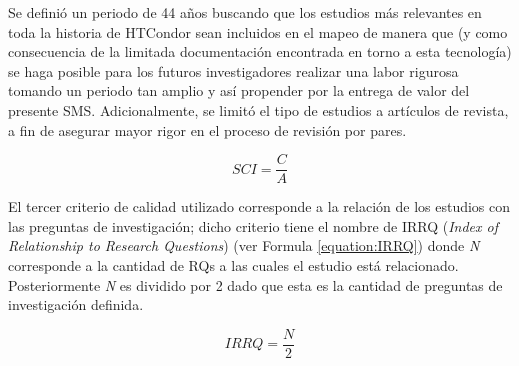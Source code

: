 Se definió un periodo de 44 años buscando que los estudios más relevantes en toda la historia de HTCondor sean incluidos en el mapeo de manera que (y como consecuencia de la limitada documentación encontrada en torno a esta tecnología) se haga posible para los futuros investigadores realizar una labor rigurosa tomando un periodo tan amplio y así propender por la entrega de valor del presente SMS. Adicionalmente, se limitó el tipo de estudios a artículos de revista, a fin de asegurar mayor rigor en el proceso de revisión por pares.

\begin{equation}
	\label{equation:SCI}
	SCI = \frac{C}{A}
\end{equation}

El tercer criterio de calidad utilizado corresponde a la relación de los estudios con las preguntas de investigación; dicho criterio tiene el nombre de IRRQ (\textit{Index of Relationship to Research Questions}) (ver Formula \ref{equation:IRRQ}) donde \textit{N} corresponde a la cantidad de RQs a las cuales el estudio está relacionado. Posteriormente \textit{N} es dividido por 2 dado que esta es la cantidad de preguntas de investigación definida.

\begin{equation}
	\label{equation:IRRQ}
	IRRQ = \frac{N}{2}
\end{equation}
